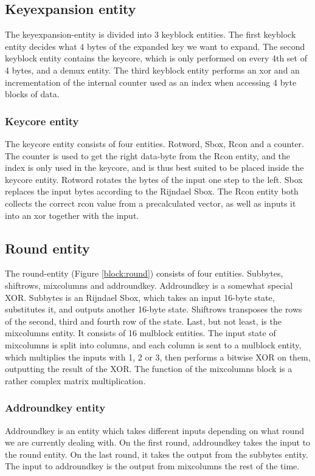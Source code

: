\subsection{Keyexpansion entity}
The keyexpansion-entity is divided into 3 keyblock entities. The first 
keyblock entity decides what 4 bytes of the expanded key we want to 
expand. The second keyblock entity contains the keycore, which is only 
performed on every 4th set of 4 bytes, and a demux entity. The third 
keyblock entity performs an xor and an incrementation of the internal 
counter used as an index when accessing 4 byte blocks of data.

\subsubsection{Keycore entity}
The keycore entity consists of four entities. Rotword, Sbox, Rcon and a 
counter. The counter is used to get the right data-byte from the Rcon 
entity, and the index is only used in the keycore, and is thus best 
suited to be placed inside the keycore entity. Rotword rotates the 
bytes of the input one step to the left. Sbox replaces the input bytes 
according to the Rijndael Sbox. The Rcon entity both collects the 
correct rcon value from a precalculated vector, as well as inputs it 
into an xor together with the input.

\subsection{Round entity}
The round-entity (Figure \ref{block:round}) consists of four entities. Subbytes, 
shiftrows, mixcolumns and addroundkey. Addroundkey is a somewhat special XOR. 
Subbytes is an Rijndael Sbox, which takes an input 16-byte state, substitutes 
it, and outputs another 16-byte state. Shiftrows transposes the rows of the 
second, third and fourth row of the state. Last, but not least, is the 
mixcolumns entity. It consists of 16 mulblock entities. The input state of 
mixcolumns is split into columns, and each column is sent to a mulblock entity, 
which multiplies the inputs with 1, 2 or 3, then performs a bitwise XOR on them, 
outputting the result of the XOR. The function of the mixcolumns block is a 
rather complex matrix multiplication.

\subsubsection{Addroundkey entity}
Addroundkey is an entity which takes different inputs depending on 
what round we are currently dealing with. On the first round, addroundkey takes 
the input to the round entity. On the last round, it takes the output from the 
subbytes entity. The input to addroundkey is the output from mixcolumns the rest 
of the time.

